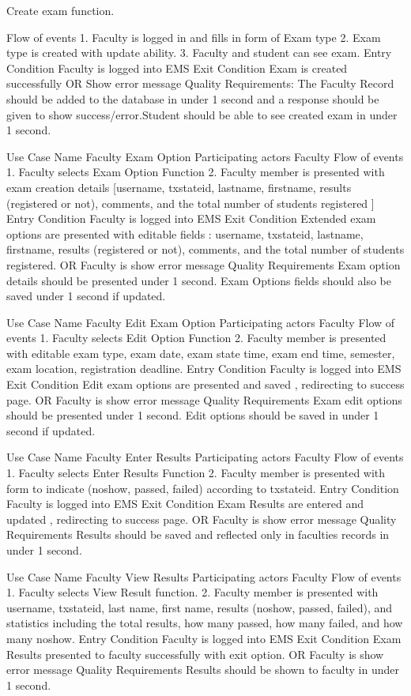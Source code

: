 Create exam function.

Flow of events	
1. Faculty is logged in and fills in form of Exam type
2. Exam type is created with update ability.
3. Faculty and student can see exam.
Entry Condition	Faculty is logged into EMS
Exit Condition	Exam is created successfully
OR 
Show error message
Quality Requirements:	The Faculty Record should be added to the database in under 1 second and a response should be given to show success/error.Student should be able to see created exam in under 1 second.
	
	
Use Case Name	Faculty Exam Option
Participating actors	 Faculty
Flow of events	
1. Faculty selects Exam Option Function
2. Faculty member is presented with exam creation details [username, txstateid, lastname, firstname, results (registered or not), comments, and the total number of students registered ]
Entry Condition	Faculty is logged into EMS
Exit Condition	Extended exam options are presented with editable fields : username, txstateid, lastname, firstname, results (registered or not), comments, and the total number of students registered.
OR
Faculty is show error message 
Quality Requirements	Exam option details should be presented under 1 second. Exam Options fields should also be saved under 1 second if updated.
	
Use Case Name	Faculty Edit Exam Option
Participating actors	 Faculty
Flow of events	
1. Faculty selects Edit Option Function
2. Faculty member is presented with editable exam type, exam date, exam state time, exam end time, semester, exam location, registration deadline. 
Entry Condition	Faculty is logged into EMS
Exit Condition	Edit exam options are presented and saved  , redirecting to success page.
OR
Faculty is show error message 
Quality Requirements	Exam edit options should be presented under 1 second. Edit options should be saved in under 1 second if updated.
	
	
Use Case Name	Faculty Enter Results
Participating actors	 Faculty
Flow of events	
1. Faculty selects Enter Results Function
2. Faculty member is presented with form to indicate (noshow, passed, failed) according to txstateid. 
Entry Condition	Faculty is logged into EMS
Exit Condition	Exam Results are entered and updated , redirecting to success page.
OR
Faculty is show error message 
Quality Requirements	Results should be saved and reflected only in faculties records in under 1 second.
	
Use Case Name	Faculty View Results
Participating actors	 Faculty
Flow of events	
1. Faculty selects View Result function.
2. Faculty member is presented with username, txstateid, last name, first name, results (noshow, passed, failed), and statistics including the total results, how many passed, how many failed, and how many noshow. 
Entry Condition	Faculty is logged into EMS
Exit Condition	Exam Results presented to faculty successfully with exit option.
OR
Faculty is show error message 
Quality Requirements	Results should be shown to faculty in under 1 second.
	
